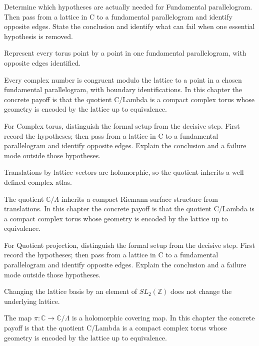 \begin{exercise}\label{exr:iv27-02}
Determine which hypotheses are actually needed for Fundamental parallelogram. Then pass from a lattice in C to a fundamental parallelogram and identify opposite edges. State the conclusion and identify what can fail when one essential hypothesis is removed.
\end{exercise}
\begin{hint}
Represent every torus point by a point in one fundamental parallelogram, with opposite edges identified.
\end{hint}
\begin{solution}
Every complex number is congruent modulo the lattice to a point in a chosen fundamental parallelogram, with boundary identifications. In this chapter the concrete payoff is that the quotient C/Lambda is a compact complex torus whose geometry is encoded by the lattice up to equivalence.
\end{solution}

\begin{exercise}\label{exr:iv27-03}
For Complex torus, distinguish the formal setup from the decisive step. First record the hypotheses; then pass from a lattice in C to a fundamental parallelogram and identify opposite edges. Explain the conclusion and a failure mode outside those hypotheses.
\end{exercise}
\begin{hint}
Translations by lattice vectors are holomorphic, so the quotient inherits a well-defined complex atlas.
\end{hint}
\begin{solution}
The quotient $\mathbb C/\Lambda$ inherits a compact Riemann-surface structure from translations. In this chapter the concrete payoff is that the quotient C/Lambda is a compact complex torus whose geometry is encoded by the lattice up to equivalence.
\end{solution}

\begin{exercise}\label{exr:iv27-04}
For Quotient projection, distinguish the formal setup from the decisive step. First record the hypotheses; then pass from a lattice in C to a fundamental parallelogram and identify opposite edges. Explain the conclusion and a failure mode outside those hypotheses.
\end{exercise}
\begin{hint}
Changing the lattice basis by an element of \(SL_2(\mathbb Z)\) does not change the underlying lattice.
\end{hint}
\begin{solution}
The map $\pi:\mathbb C\to\mathbb C/\Lambda$ is a holomorphic covering map. In this chapter the concrete payoff is that the quotient C/Lambda is a compact complex torus whose geometry is encoded by the lattice up to equivalence.
\end{solution}

